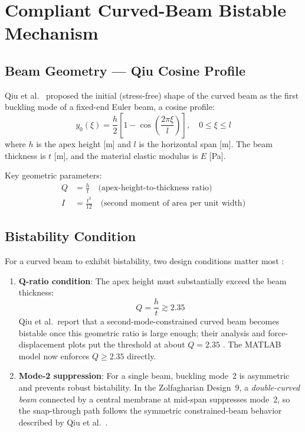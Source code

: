 \documentclass[11pt,letterpaper]{article}
\begin{document}
\section{Compliant Curved-Beam Bistable Mechanism}
\label{sec:sim2}

\subsection{Beam Geometry --- Qiu Cosine Profile}
\label{ssec:geometry}

Qiu et al.~\cite{qiu2004} proposed the initial (stress-free) shape of the
curved beam as the first buckling mode of a fixed-end Euler beam, a
cosine profile:
\begin{equation}
  y_0(\xi) = \frac{h}{2}\left[1 - \cos\!\left(\frac{2\pi\xi}{l}\right)\right],
  \quad 0 \leq \xi \leq l
  \label{eq:beamprofile}
\end{equation}
where $h$ is the apex height [m] and $l$ is the horizontal span [m]. The beam
thickness is $t$ [m], and the material elastic modulus is $E$ [Pa].

Key geometric parameters:
\begin{align}
  Q &= \frac{h}{t} \quad\text{(apex-height-to-thickness ratio)} \label{eq:Qdef}\\
  I &= \frac{t^3}{12} \quad\text{(second moment of area per unit width)} \label{eq:Idef}
\end{align}

\subsection{Bistability Condition}
\label{ssec:bistability_condition}

For a curved beam to exhibit bistability, two design conditions matter most
\cite{qiu2004,zolfagharian2025}:

\begin{enumerate}
  \item \textbf{Q-ratio condition}: The apex height must substantially exceed
    the beam thickness:
    \begin{equation}
      Q = \frac{h}{t} \gtrsim 2.35
      \label{eq:Qcond}
    \end{equation}
    Qiu et al.\ report that a second-mode-constrained curved beam becomes
    bistable once this geometric ratio is large enough; their analysis and
    force-displacement plots put the threshold at about $Q=2.35$
    \cite{qiu2004}. The MATLAB model now enforces $Q\geq2.35$ directly.

  \item \textbf{Mode-2 suppression}: For a single beam, buckling mode~2 is
    asymmetric and prevents robust bistability. In the Zolfagharian Design~9, a
    \emph{double-curved beam} connected by a central membrane at mid-span
    suppresses mode~2, so the snap-through path follows the symmetric
    constrained-beam behavior described by Qiu et al.~\cite{qiu2004}.
\end{enumerate}
\end{document}
